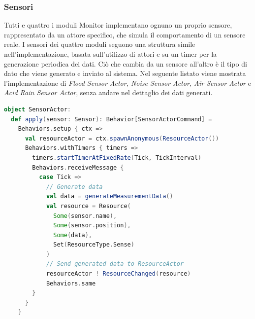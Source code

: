 \documentclass[12pt]{article}
\begin{document}
\subsubsection{Sensori}
Tutti e quattro i moduli Monitor implementano ognuno un proprio sensore, rappresentato da un attore specifico, che simula il comportamento di un sensore reale. I sensori dei quattro moduli seguono una struttura simile nell'implementazione, basata sull'utilizzo di attori e su un timer per la generazione periodica dei dati. Ciò che cambia da un sensore all'altro è il tipo di dato che viene generato e inviato al sistema.
Nel seguente listato viene mostrata l'implementazione di \textit{Flood Sensor Actor,
    Noise Sensor Actor, Air Sensor Actor} e \textit{Acid Rain Sensor Actor}, senza andare nel dettaglio dei dati generati.

\begin{lstlisting}[language=Scala]
object SensorActor:
  def apply(sensor: Sensor): Behavior[SensorActorCommand] =
    Behaviors.setup { ctx =>
      val resourceActor = ctx.spawnAnonymous(ResourceActor())
      Behaviors.withTimers { timers =>
        timers.startTimerAtFixedRate(Tick, TickInterval)
        Behaviors.receiveMessage {
          case Tick =>
            // Generate data
            val data = generateMeasurementData()
            val resource = Resource(
              Some(sensor.name),
              Some(sensor.position),
              Some(data),
              Set(ResourceType.Sense)
            )
            // Send generated data to ResourceActor
            resourceActor ! ResourceChanged(resource)
            Behaviors.same
        }
      }
    }
\end{lstlisting}
\end{document}
